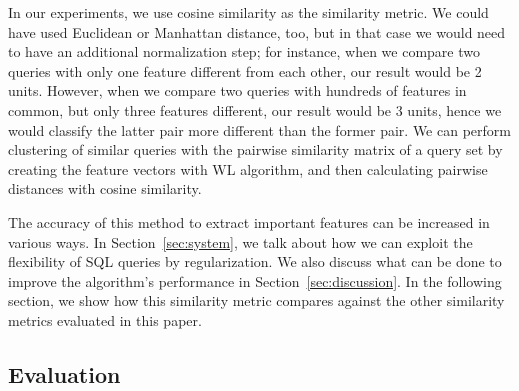
In our experiments, we use cosine similarity as the similarity metric. We could have used Euclidean or Manhattan distance, too, but in that case we would need to have an additional normalization step; for instance, when we compare two queries with only one feature different from each other, our result would be 2 units. However, when we compare two queries with hundreds of features in common, but only three features different, our result would be 3 units, hence we would classify the latter pair more different than the former pair. We can perform clustering of similar queries with the pairwise similarity matrix of a query set by creating the feature vectors with WL algorithm, and then calculating pairwise distances with cosine similarity.

The accuracy of this method to extract important features can be increased in various ways. In Section~\ref{sec:system}, we talk about how we can exploit the flexibility of SQL queries by regularization. We also discuss what can be done to improve the algorithm's performance in Section~\ref{sec:discussion}. In the following section, we show how this similarity metric compares against the other similarity metrics evaluated in this paper.

\subsection{Evaluation}


